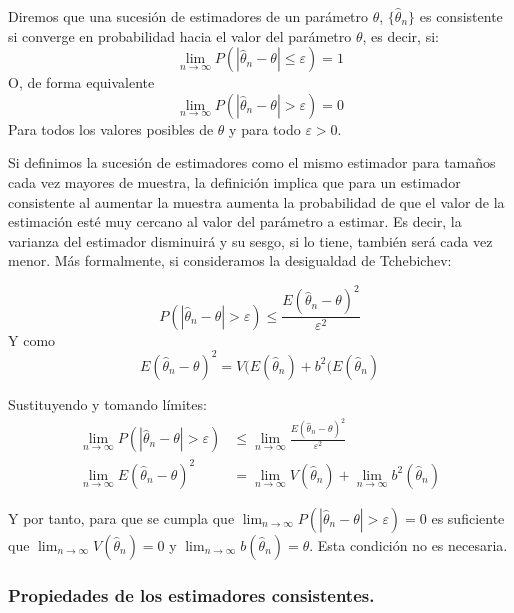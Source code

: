 \begin{definicion}
Diremos que una sucesi\'on de estimadores de un par\'ametro $\theta$, $\{\hat{\theta}_n\}$ es consistente si converge en probabilidad hacia el valor del par\'ametro $\theta$, es decir, si:
\begin{equation*}
\lim_{n\to\infty}P\left(\left|\hat{\theta}_n-\theta\right|\leq\varepsilon\right)=1
\end{equation*}
O, de forma equivalente
\begin{equation*}
\lim_{n\to\infty}P\left(\left|\hat{\theta}_n-\theta\right|>\varepsilon\right)=0
\end{equation*}
Para todos los valores posibles de $\theta$ y para todo $\varepsilon>0$.
\end{definicion}

Si definimos la sucesi\'on de estimadores como el mismo estimador para tama\~nos cada vez mayores de muestra, la definici\'on implica que para un estimador consistente al aumentar la muestra aumenta la probabilidad de que el valor de la estimaci\'on est\'e muy cercano al valor del par\'ametro a estimar. Es decir, la varianza del estimador disminuir\'a y su sesgo, si lo tiene, tambi\'en ser\'a cada vez menor. M\'as formalmente, si consideramos la desigualdad de Tchebichev:

\begin{equation*}
P\left(\left|\hat{\theta}_n-\theta\right|>\varepsilon\right)\leq\frac{E(\hat{\theta}_n-\theta)^2}{\varepsilon^2}
\end{equation*}
Y como
\begin{equation*}
E(\hat{\theta}_n-\theta)^2=V(E(\hat{\theta}_n)+b^2(E(\hat{\theta}_n)
\end{equation*}

Sustituyendo y tomando l\'imites:
\begin{align*}
\lim_{n\to\infty}P\left(\left|\hat{\theta}_n-\theta\right|>\varepsilon\right)&\leq\lim_{n\to\infty}\frac{E(\hat{\theta}_n-\theta)^2}{\varepsilon^2}\\
\lim_{n\to\infty}E(\hat{\theta}_n-\theta)^2&=\lim_{n\to\infty}V(\hat{\theta}_n)+\lim_{n\to\infty}b^2(\hat{\theta}_n)
\end{align*}

Y por tanto, para que se cumpla que $\lim_{n\to\infty}P\left(\left|\hat{\theta}_n-\theta\right|>\varepsilon\right)=0$ es suficiente que $\lim_{n\to\infty}V(\hat{\theta}_n)=0$ y $\lim_{n\to\infty}b(\hat{\theta}_n)=\theta$. Esta condici\'on no es necesaria.

\subsubsection{Propiedades de los estimadores consistentes.}


